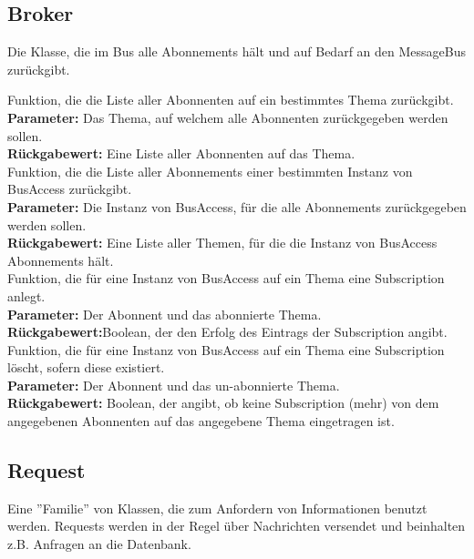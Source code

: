 \documentclass[entwurf.tex]{subfiles}
\begin{document}
		\subsection{Broker}
		\label{Class:Broker}
		Die Klasse, die im Bus alle Abonnements hält und auf Bedarf an den MessageBus zurückgibt.\\
		
		\begin{description}
		Funktion, die die Liste aller Abonnenten auf ein bestimmtes Thema zurückgibt. \\
		\textbf{Parameter:} Das Thema, auf welchem alle Abonnenten zurückgegeben werden sollen.	\\
		\textbf{Rückgabewert:} Eine Liste aller Abonnenten auf das Thema.	\\
		

		Funktion, die die Liste aller Abonnements einer bestimmten Instanz von BusAccess zurückgibt. \\
		\textbf{Parameter:} Die Instanz von BusAccess, für die alle Abonnements zurückgegeben werden sollen.	\\
		\textbf{Rückgabewert:} Eine Liste aller Themen, für die die Instanz von BusAccess Abonnements hält. 	\\
		
		Funktion, die für eine Instanz von BusAccess auf ein Thema eine Subscription anlegt. \\
		\textbf{Parameter:} Der Abonnent und das abonnierte Thema. \\
		\textbf{Rückgabewert:}Boolean, der den Erfolg des Eintrags der Subscription angibt. \\
		
		Funktion, die für eine Instanz von BusAccess auf ein Thema eine Subscription löscht, sofern diese existiert. \\
		\textbf{Parameter:} Der Abonnent und das un-abonnierte Thema. \\
		\textbf{Rückgabewert:} Boolean, der angibt, ob keine Subscription (mehr) von dem angegebenen Abonnenten auf das angegebene Thema eingetragen ist. \\
		\end{description}
		
		\subsection{Request}
		\label{ClassFamily:Request}
		Eine ''Familie'' von Klassen, die zum Anfordern von Informationen benutzt werden. Requests werden in der Regel über Nachrichten versendet und beinhalten z.B. Anfragen an die Datenbank.
		
		
\end{document}
